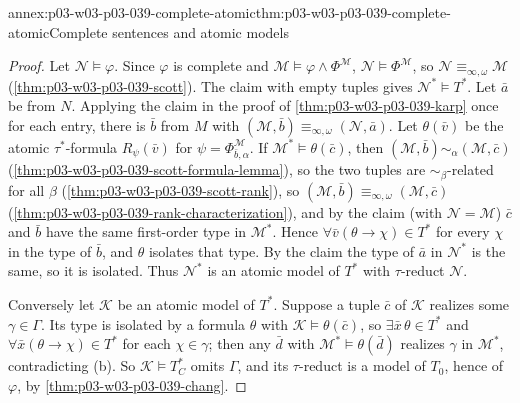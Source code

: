 \begin{annexitem}{annex:p03-w03-p03-039-complete-atomic}{thm:p03-w03-p03-039-complete-atomic}{Complete sentences and atomic models}
\begin{proof}
Let \(\mathcal N\models\varphi\). Since \(\varphi\) is complete and
\(\mathcal M\models\varphi\wedge\Phi^{\mathcal M}\),
\(\mathcal N\models\Phi^{\mathcal M}\), so
\(\mathcal N\equiv_{\infty,\omega}\mathcal M\)
(\cref{thm:p03-w03-p03-039-scott}). The claim with empty tuples gives
\(\mathcal N^*\models T^*\). Let \(\bar a\) be from \(N\). Applying the claim
in the proof of \cref{thm:p03-w03-p03-039-karp} once for each entry, there is
\(\bar b\) from \(M\) with \((\mathcal M,\bar b)\equiv_{\infty,\omega}(\mathcal N,\bar a)\).
Let \(\theta(\bar v)\) be the atomic \(\tau^*\)-formula \(R_\psi(\bar v)\) for
\(\psi=\Phi^{\mathcal M}_{\bar b,\alpha}\). If \(\mathcal M^*\models\theta(\bar c)\),
then \((\mathcal M,\bar b)\sim_\alpha(\mathcal M,\bar c)\)
(\cref{thm:p03-w03-p03-039-scott-formula-lemma}), so the two tuples are
\(\sim_\beta\)-related for all \(\beta\)
(\cref{thm:p03-w03-p03-039-scott-rank}), so
\((\mathcal M,\bar b)\equiv_{\infty,\omega}(\mathcal M,\bar c)\)
(\cref{thm:p03-w03-p03-039-rank-characterization}), and by the claim (with
\(\mathcal N=\mathcal M\)) \(\bar c\) and \(\bar b\) have the same
first-order type in \(\mathcal M^*\). Hence
\(\forall\bar v(\theta\to\chi)\in T^*\) for every \(\chi\) in the type of
\(\bar b\), and \(\theta\) isolates that type. By the claim the type of
\(\bar a\) in \(\mathcal N^*\) is the same, so it is isolated. Thus
\(\mathcal N^*\) is an atomic model of \(T^*\) with \(\tau\)-reduct
\(\mathcal N\).

Conversely let \(\mathcal K\) be an atomic model of \(T^*\). Suppose a tuple
\(\bar c\) of \(\mathcal K\) realizes some \(\gamma\in\Gamma\). Its type is
isolated by a formula \(\theta\) with \(\mathcal K\models\theta(\bar c)\), so
\(\exists\bar x\,\theta\in T^*\) and \(\forall\bar x(\theta\to\chi)\in T^*\)
for each \(\chi\in\gamma\); then any \(\bar d\) with
\(\mathcal M^*\models\theta(\bar d)\) realizes \(\gamma\) in \(\mathcal M^*\),
contradicting (b). So \(\mathcal K\models T^*_C\) omits \(\Gamma\), and its
\(\tau\)-reduct is a model of \(T_0\), hence of \(\varphi\), by
\cref{thm:p03-w03-p03-039-chang}.


\end{proof}
\end{annexitem}
